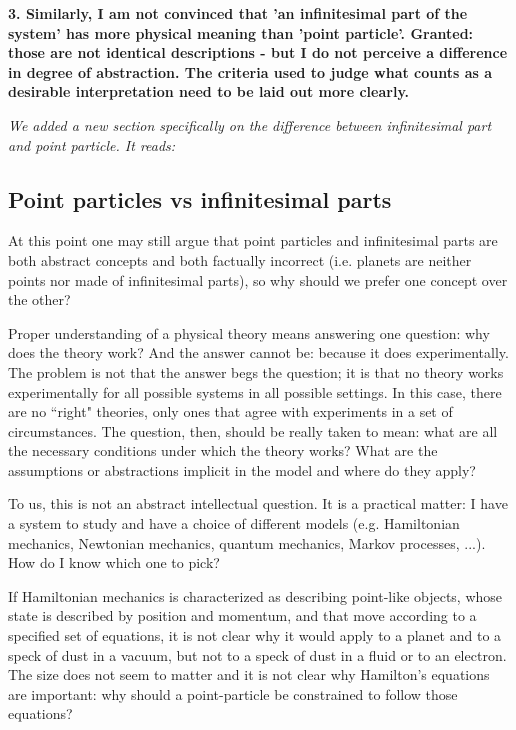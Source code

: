 \documentclass[11pt]{article}
\begin{document}
\vspace{1cm}

\textbf{3. Similarly, I am not convinced that 'an infinitesimal part of the system' has more physical meaning than 'point particle'. Granted: those are not identical descriptions - but I do not perceive a difference in degree of abstraction. The criteria used to judge what counts as a desirable interpretation need to be laid out more clearly. }

\emph{We added a new section specifically on the difference between infinitesimal part and point particle. It reads:}

\subsection*{Point particles vs infinitesimal parts}

At this point one may still argue that point particles and infinitesimal parts are both abstract concepts and both factually incorrect (i.e. planets are neither points nor made of infinitesimal parts), so why should we prefer one concept over the other?

Proper understanding of a physical theory means answering one question: why does the theory work? And the answer cannot be: because it does experimentally. The problem is not that the answer begs the question; it is that no theory works experimentally for all possible systems in all possible settings. In this case, there are no ``right" theories, only ones that agree with experiments in a set of circumstances. The question, then, should be really taken to mean: what are all the necessary conditions under which the theory works? What are the assumptions or abstractions implicit in the model and where do they apply?

To us, this is not an abstract intellectual question. It is a practical matter: I have a system to study and have a choice of different models (e.g. Hamiltonian mechanics, Newtonian mechanics, quantum mechanics, Markov processes, ...). How do I know which one to pick?

If Hamiltonian mechanics is characterized as describing point-like objects, whose state is described by position and momentum, and that move according to a specified set of equations, it is not clear why it would apply to a planet and to a speck of dust in a vacuum, but not to a speck of dust in a fluid or to an electron. The size does not seem to matter and it is not clear why Hamilton's equations are important: why should a point-particle be constrained to follow those equations?
\end{document}
